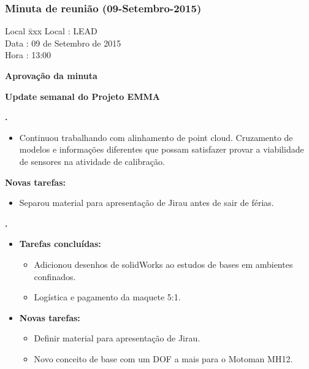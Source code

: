 \subsubsection{Minuta de reunião (09-Setembro-2015)}

\begin{tabbing}
  Local \= xxx \kill
  Local \> : LEAD \\
  Data  \> : 09 de Setembro de 2015 \\
  Hora  \> : 13:00
\end{tabbing}


\textbf{Aprovação da minuta}

\textbf{Update semanal do Projeto EMMA}
   							
							
\textbf{\gabriel.} 
	\begin{itemize}
			\item Continuou trabalhando com alinhamento de point cloud. Cruzamento de
			modelos e informações diferentes que possam satisfazer provar a viabilidade de sensores na atividade de calibração.
			\end{itemize}
		
		\item \textbf{Novas tarefas:}
			\begin{itemize} 
				\item Separou material para apresentação de Jirau antes de sair de férias.
			\end{itemize}

					
			
   \textbf{.} 
	\begin{itemize}
		\item \textbf{Tarefas concluídas:}
			\begin{itemize}  
			  \item Adicionou desenhos de solidWorks ao estudos de bases em ambientes
			  confinados.
			  \item Logística e pagamento da maquete 5:1.
			\end{itemize}
		
		\item \textbf{Novas tarefas:}
			\begin{itemize} 
				\item Definir material para apresentação de Jirau.
				\item Novo conceito de base com um DOF a mais para o Motoman MH12.
			\end{itemize}
	\end{itemize}

